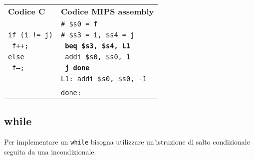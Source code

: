 \documentclass[../main.tex]{subfiles}
\begin{document}
\noindent
\begin{tabular}{ p{7cm} p{7cm} }
    \textbf{Codice C} & \textbf{Codice MIPS assembly} \\
    & \texttt{\# \$s0 = f} \\
	\texttt{if (i != j)} & \texttt{\# \$s3 = i, \$s4 = j} \\
    \texttt{ \hspace*{0cm} \hspace*{0cm} \hspace*{0cm} f++;} & \texttt{ \hspace*{0cm} \hspace*{0cm} \hspace*{0cm} \hspace*{0cm} \hspace*{0cm} \textbf{beq \$s3, \$s4, L1}} \\
    \texttt{else} & \texttt{ \hspace*{0cm} \hspace*{0cm} \hspace*{0cm} \hspace*{0cm} \hspace*{0cm} addi \$s0, \$s0, 1} \\
    \texttt{ \hspace*{0cm} \hspace*{0cm} \hspace*{0cm} f--;} & \texttt{ \hspace*{0cm} \hspace*{0cm} \hspace*{0cm} \hspace*{0cm} \hspace*{0cm} \textbf{j done}} \\
    & \texttt{L1: \hspace*{0cm} addi \$s0, \$s0, -1} \\
    \\
    & \texttt{done:} \\
\end{tabular}

\subsection{while}
\vspace*{-2mm}
Per implementare un \texttt{while} bisogna utilizzare un'istruzione
di salto condizionale seguita da una incondizionale.

\vspace*{2.5mm}
\end{document}
